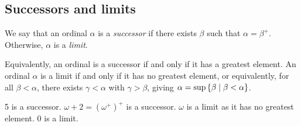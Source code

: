 \subsection{Successors and limits}
\begin{definition}
    We say that an ordinal \( \alpha \) is a \emph{successor} if there exists \( \beta \) such that \( \alpha = \beta^+ \).
    Otherwise, \( \alpha \) is a \emph{limit}.
\end{definition}
Equivalently, an ordinal is a successor if and only if it has a greatest element.
An ordinal \( \alpha \) is a limit if and only if it has no greatest element, or equivalently, for all \( \beta < \alpha \), there exists \( \gamma < \alpha \) with \( \gamma > \beta \), giving \( \alpha = \sup \qty{\beta \mid \beta < \alpha} \).
\begin{example}
    5 is a successor.
    \( \omega + 2 = (\omega^+)^+ \) is a successor.
    \( \omega \) is a limit as it has no greatest element.
    0 is a limit.
\end{example}

